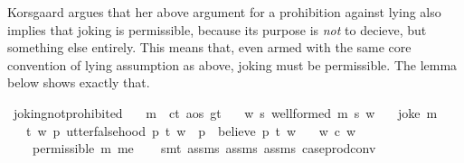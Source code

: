 \begin{isabellebody}
\begin{isamarkuptext}
Korsgaard argues that her above argument for a prohibition against lying also implies that joking is 
permissible, because its purpose is \emph{not} to decieve, but something else entirely. This means that, 
even armed with the same core convention of lying assumption as above, joking must be permissible. The 
lemma below shows exactly that.%
\end{isamarkuptext}\isamarkuptrue%
\isamarkupfalse%
\ joking{\isacharunderscore}not{\isacharunderscore}prohibited{\isacharcolon}\isanewline
\ \ \ {\isachardoublequoteopen}m\ {\isasymequiv}\ {\isacharparenleft}c{\isacharcolon}{\isacharcolon}t{\isacharcomma}\ a{\isacharcolon}{\isacharcolon}os{\isacharcomma}\ g{\isacharcolon}{\isacharcolon}t{\isacharparenright}{\isachardoublequoteclose}\isanewline
\ \ \ {\isachardoublequoteopen}{\isasymforall}w{\isachardot}\ {\isasymforall}s{\isachardot}\ well{\isacharunderscore}formed\ m\ s\ w{\isachardoublequoteclose}\isanewline
%
\isanewline
\ \ \ {\isachardoublequoteopen}joke\ m{\isachardoublequoteclose}\isanewline
%
\isanewline
\ \ \ {\isachardoublequoteopen}{\isasymforall}t\ w{\isachardot}\ {\isacharparenleft}{\isacharparenleft}{\isasymforall}p{\isachardot}\ utter{\isacharunderscore}falsehood\ p\ t\ w{\isacharparenright}\ {\isasymlongrightarrow}\ {\isacharparenleft}{\isasymforall}p{\isachardot}\ \isactrlbold {\isasymnot}\ {\isacharparenleft}believe\ p\ t{\isacharparenright}\ w{\isacharparenright}{\isacharparenright}{\isachardoublequoteclose}\isanewline
%
\isanewline
\ \ \ {\isachardoublequoteopen}{\isasymforall}w{\isachardot}\ c\ w{\isachardoublequoteclose}\isanewline
%
\isanewline
\ \ \ {\isachardoublequoteopen}{\isasymTurnstile}\ {\isacharparenleft}permissible\ m\ me{\isacharparenright}{\isachardoublequoteclose}\isanewline
%
\isadelimproof
\ \ %
\endisadelimproof
%
\isatagproof
{}\isamarkupfalse%
\ {\isacharparenleft}smt\ assms{\isacharparenleft}{}{\isacharparenright}\ assms{\isacharparenleft}{}{\isacharparenright}\ assms{\isacharparenleft}{}{\isacharparenright}\ case{\isacharunderscore}prod{\isacharunderscore}conv{\isacharparenright}%

\end{isabellebody}
